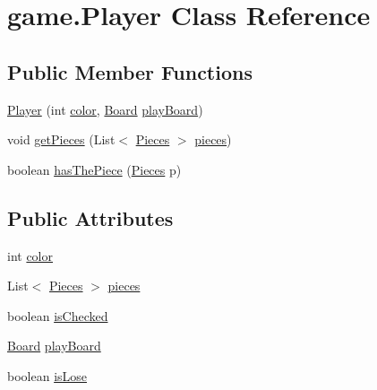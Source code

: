 \hypertarget{classgame_1_1_player}{}\section{game.\+Player Class Reference}
\label{classgame_1_1_player}
\subsection*{Public Member Functions}
\begin{DoxyCompactItemize}
\item 
\mbox{\hyperlink{classgame_1_1_player_ab50e8fdec094890642f652d2529356e7}{Player}} (int \mbox{\hyperlink{classgame_1_1_player_a78e50f5f23d0c3f75abb86e1e9c6f63d}{color}}, \mbox{\hyperlink{classgame_1_1_board}{Board}} \mbox{\hyperlink{classgame_1_1_player_a00d2553d16a3ade53d5671421fa8dcf6}{play\+Board}})
\item 
void \mbox{\hyperlink{classgame_1_1_player_a936532b865afe0eb13cf4bbc490c78f8}{get\+Pieces}} (List$<$ \mbox{\hyperlink{classpieces_1_1_pieces}{Pieces}} $>$ \mbox{\hyperlink{classgame_1_1_player_a9028dcf4027ecd82c1d9494f7e304960}{pieces}})
\item 
boolean \mbox{\hyperlink{classgame_1_1_player_a7d2facf4888849be1ffcab77f12eccd5}{has\+The\+Piece}} (\mbox{\hyperlink{classpieces_1_1_pieces}{Pieces}} p)
\end{DoxyCompactItemize}
\subsection*{Public Attributes}
\begin{DoxyCompactItemize}
\item 
int \mbox{\hyperlink{classgame_1_1_player_a78e50f5f23d0c3f75abb86e1e9c6f63d}{color}}
\item 
List$<$ \mbox{\hyperlink{classpieces_1_1_pieces}{Pieces}} $>$ \mbox{\hyperlink{classgame_1_1_player_a9028dcf4027ecd82c1d9494f7e304960}{pieces}}
\item 
boolean \mbox{\hyperlink{classgame_1_1_player_a55490a38f00ba09f4d6fab5ea6d57de7}{is\+Checked}}
\item 
\mbox{\hyperlink{classgame_1_1_board}{Board}} \mbox{\hyperlink{classgame_1_1_player_a00d2553d16a3ade53d5671421fa8dcf6}{play\+Board}}
\item 
boolean \mbox{\hyperlink{classgame_1_1_player_a3016e4b3cc8dae43ad3e08d31c8a5e3b}{is\+Lose}}
\end{DoxyCompactItemize}


